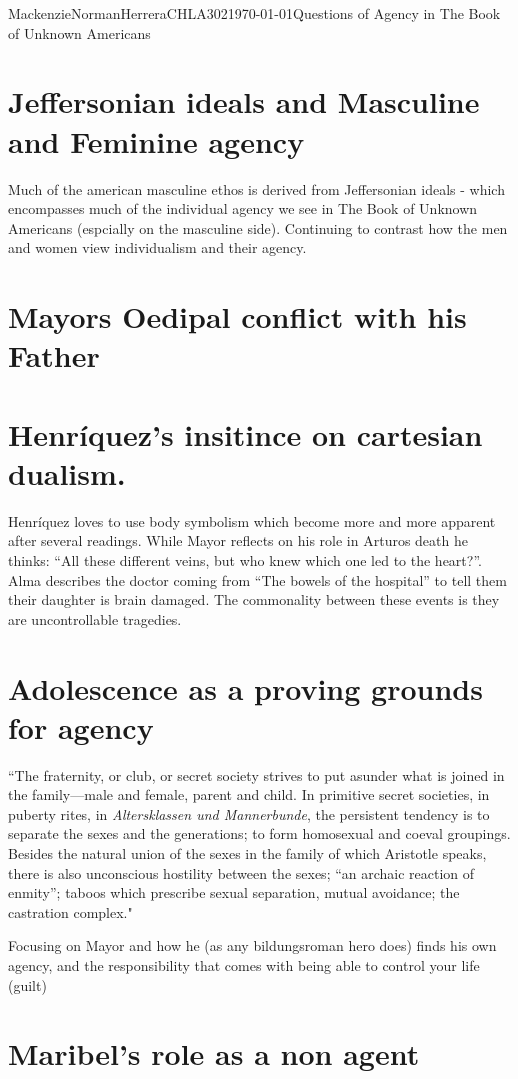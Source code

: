 \documentclass{article}
\begin{document}
\begin{mla}{Mackenzie}{Norman}{Herrera}{CHLA302}{\today}{Questions of Agency in The Book of Unknown Americans}
\section*{Jeffersonian ideals and Masculine and Feminine agency}
Much of the american masculine ethos is derived from Jeffersonian ideals - which encompasses much of the individual agency we see in The Book of Unknown Americans (espcially on the masculine side).  Continuing to contrast how the men and women view individualism and their agency.
\section*{Mayors Oedipal conflict with his Father}

\section*{Henríquez's insitince on cartesian dualism.}
Henríquez loves to use body symbolism which become more and more apparent after several readings. While Mayor reflects on his role in Arturos death he thinks: ``All these different veins, but who knew which one led to the heart?''. Alma describes the doctor coming from ``The bowels of the hospital'' to tell them their daughter is brain damaged. The commonality between these events is they are uncontrollable tragedies. 

\section*{Adolescence as a proving grounds for agency}
``The fraternity, or club, or secret society strives to put asunder what is joined in the family—male and female, parent and child. In primitive secret societies, in puberty rites, in \textit{Altersklassen und Mannerbunde}, the persistent tendency is to separate the sexes and the generations; to form homosexual and coeval groupings. Besides the natural union of the sexes in the family of which Aristotle speaks, there is also unconscious hostility between the sexes; ``an archaic reaction of enmity''; taboos which prescribe sexual separation, mutual avoidance; the castration complex."

Focusing on Mayor and how he (as any bildungsroman hero does) finds his own agency, and the responsibility that comes with being able to control your life (guilt)


\section*{Maribel’s role as a non agent}


\end{mla}
\end{document}
